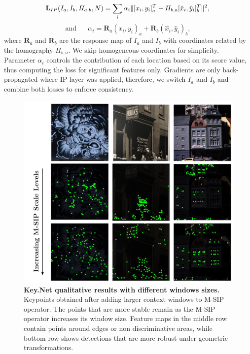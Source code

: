 \begin{equation*}
\mathbf{L}_{IP}(I_a,I_b,H_{a,b}, N) = \sum_{\substack{i}} \alpha_i\| [{x_i}, {y_i}]^T_{a} - H_{b,a}[{\hat{x}_i}, {\hat{y}_i}]^T_{b}\|^2, \\
\end{equation*}
\begin{equation}
\textrm{and  } \textrm{ } \textrm{ } \alpha_i =  \mathbf{R}_{a}({x_i}, {y_i})_{a} + \mathbf{R}_{b}({\hat{x}_i}, {\hat{y}_i})_{b},
\label{eq:context_losses}
\end{equation}
where $\mathbf{R}_{a}$ and $\mathbf{R}_{b}$ are the response map of $I_a$ and $I_b$ with coordinates related by the homography $H_{b,a}$. We skip homogeneous coordinates for simplicity. Parameter $\alpha_{i}$ controls the contribution of each location based on its score value, thus computing the loss for significant features only. Gradients are only back-propagated where IP layer was applied, therefore, we switch $I_{a}$ and $I_{b}$ and combine both losses to enforce consistency.



\begin{figure}[!tbh]
\vspace{-0.10cm}
 \hspace*{-0.4cm} 
 \centering
   \includegraphics[scale=0.48]{main/chapter02/figures/M-SIP_Scale_Levels_v5.pdf}
   \vspace{-0.2cm}
    \caption[Key.Net qualitative results with different windows sizes]{\textbf{Key.Net qualitative results with different windows sizes.} Keypoints obtained after adding larger context windows to M-SIP operator. The points that are more stable remain as the M-SIP operator increases its window size. Feature maps in the middle row contain points around edges or non discriminative areas, while bottom row shows detections that are more robust under geometric transformations.}
    \label{fig:M-SIP_Scale_Levels}
\end{figure}

